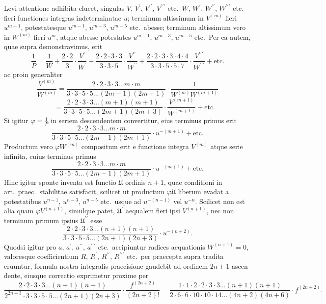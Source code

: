 \documentclass[12pt,a4paper]{article}
\newcommand{\UU}{\mathfrak{U}}
\begin{document}
Levi attentione adhibita elucet, singulas $V$, $V^\prime$, $V^{\prime\prime}$, $V^{\prime\prime\prime}$ etc.\ $W$, $W^\prime$, $W^{\prime\prime}$, $W^{\prime\prime\prime}$ etc.
fieri functiones integras indeterminatae $u$; terminum altissimum in $V^{(m)}$ fieri
$u^{m+1}$, potestatesque $u^{m-1}$, $u^{m-3}$, $u^{m-5}$ etc.\ abesse; terminum altissimum vero in
$W^{(m)}$ fieri $u^m$, atque abesse potestates $u^{m-1}$, $u^{m-3}$, $u^{m-5}$ etc.\ Per ea autem, quae
supra demonstravimus, erit
\[
\frac{1}{P} = \frac{1}{W} + \frac{2 \cdot 2}{3} \cdot \frac{V^\prime}{W^\prime} + \frac{2 \cdot 2 \cdot 3 \cdot 3}{3 \cdot 3 \cdot 5} \cdot \frac{V^{\prime\prime}}{W^{\prime\prime}} + \frac{2 \cdot 2 \cdot 3 \cdot 3 \cdot 4 \cdot 4}{3 \cdot 3 \cdot 5 \cdot 5 \cdot 7} \cdot \frac{V^{\prime\prime\prime}}{W^{\prime\prime\prime}} + \text{etc.}
\]
ac proin generaliter
\[
\frac{V^{(m)}}{W^{(m)}} = \frac{2 \cdot 2 \cdot 3 \cdot 3 \ldots m \cdot m}{3 \cdot 3 \cdot 5 \cdot 5 \ldots (2m-1)(2m+1)} \cdot \frac{1}{W^{(m)} W^{(m+1)}}
\]
\[
\qquad = \frac{2 \cdot 2 \cdot 3 \cdot 3 \ldots (m+1)(m+1)}{3 \cdot 3 \cdot 5 \cdot 5 \ldots (2m+1)(2m+3)} \cdot \frac{V^{(m+1)}}{W^{(m+1)}} + \text{etc.}
\]
Si igitur $\varphi = \frac{1}{P}$ in seriem descendentem convertitur, eius terminus primus erit
\[
\frac{2 \cdot 2 \cdot 3 \cdot 3 \ldots m \cdot m}{3 \cdot 3 \cdot 5 \cdot 5 \ldots (2m-1)(2m+1)} \cdot u^{-(m+1)} + \text{etc.}
\]
Productum vero $\varphi W^{(m)}$ compositum erit e functione integra $V^{(m)}$ atque serie
infinita, cuius terminus primus
\[
\frac{2 \cdot 2 \cdot 3 \cdot 3 \ldots m \cdot m}{3 \cdot 3 \cdot 5 \cdot 5 \ldots (2m-1)(2m+1)} \cdot u^{-(m+1)} + \text{etc.}
\]
Hinc igitur sponte inventa est functio $\UU$ ordinis $n+1$, quae conditioni in
art.\ praec.\ stabilitae satisfacit, scilicet ut productum $\varphi \UU$ liberum evadat a potestatibus
$u^{n-1}$, $u^{n-3}$, $u^{n-5}$ etc.\ usque ad $u^{-(n-1)}$ vel $u^{-n}$. Scilicet non est alia quam $\varphi V^{(n+1)}$, simulque patet, $\UU^\prime$ aequalem fieri ipsi $V^{(n+1)}$, nec non terminum primum ipsius $\UU^{\prime\prime}$ esse
\[
\frac{2 \cdot 2 \cdot 3 \cdot 3 \ldots (n+1)(n+1)}{3 \cdot 3 \cdot 5 \cdot 5 \ldots (2n+1)(2n+3)} \cdot u^{-(n+2)}.
\]
Quodsi igitur pro $a$, $a^\prime$, $a^{\prime\prime}$, $a^{\prime\prime\prime}$ etc.\ accipiuntur radices aequationis $W^{(n+1)} = 0$,
valoresque coefficientium $R$, $R^\prime$, $R^{\prime\prime}$, $R^{\prime\prime\prime}$ etc.\ per praecepta supra tradita eruuntur,
formula nostra integralis praecisione gaudebit ad ordinem $2n+1$ ascen-
dente, eiusque correctio exprimetur proxime per
\[
\frac{2 \cdot 2 \cdot 3 \cdot 3 \ldots (n+1)(n+1)}{2^{2n+3} \cdot 3 \cdot 3 \cdot 5 \cdot 5 \ldots (2n+1)(2n+3)} \cdot \frac{f^{(2n+2)}}{(2n+2)!} = \frac{1 \cdot 1 \cdot 2 \cdot 2 \cdot 3 \cdot 3 \ldots (n+1)(n+1)}{2 \cdot 6 \cdot 6 \cdot 10 \cdot 10 \cdot 14 \ldots (4n+2)(4n+6)} \cdot f^{(2n+2)}.
\]
\end{document}
